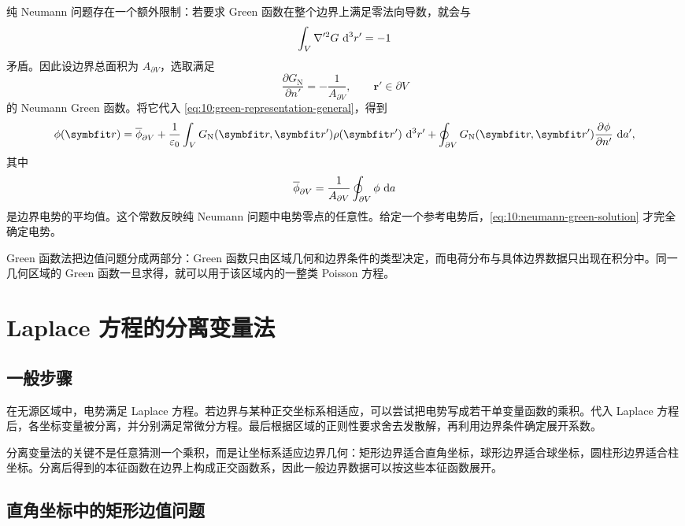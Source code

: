 纯 Neumann 问题存在一个额外限制：若要求 Green 函数在整个边界上满足零法向导数，就会与
\[
\int_{V}\nabla'^{2}G\,\mathop{}\!\mathrm{d}^{3}r'=-1
\]
矛盾。因此设边界总面积为 $A_{\partial V}$，选取满足
\begin{equation}
	\frac{\partial G_{\mathrm{N}}}{\partial n'}
	=
	-\frac{1}{A_{\partial V}},
	\qquad
	\bm{r}'\in\partial V
	\label{eq:10:neumann-green-boundary}
\end{equation}
的 Neumann Green 函数。将它代入
\eqref{eq:10:green-representation-general}，得到
\begin{equation}
	\phi(\bm{r})
	=
	\overline{\phi}_{\partial V}
	+
	\frac{1}{\varepsilon_{0}}
	\int_{V}
	G_{\mathrm{N}}(\bm{r},\bm{r}')
	\rho(\bm{r}')
	\,\dif^{3}r'
	+
	\oint_{\partial V}
	G_{\mathrm{N}}(\bm{r},\bm{r}')
	\frac{\partial\phi}{\partial n'}
	\,\dif a',
	\label{eq:10:neumann-green-solution}
\end{equation}
其中
\[
\overline{\phi}_{\partial V}
=
\frac{1}{A_{\partial V}}
\oint_{\partial V}\phi\,\mathop{}\!\mathrm{d} a
\]
是边界电势的平均值。这个常数反映纯 Neumann 问题中电势零点的任意性。给定一个参考电势后，\eqref{eq:10:neumann-green-solution} 才完全确定电势。

Green 函数法把边值问题分成两部分：Green 函数只由区域几何和边界条件的类型决定，而电荷分布与具体边界数据只出现在积分中。同一几何区域的 Green 函数一旦求得，就可以用于该区域内的一整类 Poisson 方程。

\section{Laplace 方程的分离变量法}

\subsection{一般步骤}

在无源区域中，电势满足 Laplace 方程。若边界与某种正交坐标系相适应，可以尝试把电势写成若干单变量函数的乘积。代入 Laplace 方程后，各坐标变量被分离，并分别满足常微分方程。最后根据区域的正则性要求舍去发散解，再利用边界条件确定展开系数。

分离变量法的关键不是任意猜测一个乘积，而是让坐标系适应边界几何：矩形边界适合直角坐标，球形边界适合球坐标，圆柱形边界适合柱坐标。分离后得到的本征函数在边界上构成正交函数系，因此一般边界数据可以按这些本征函数展开。

\subsection{直角坐标中的矩形边值问题}

